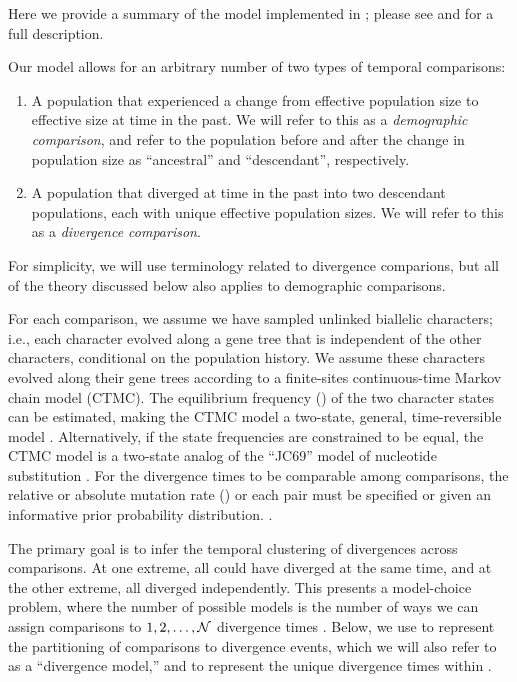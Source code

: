 Here we provide a summary of the model implemented in \ecoevolity; please see
\citet{Oaks2018ecoevolity} and \citet{Oaks2019codemog} for a full description.

Our model allows for an arbitrary number of two types of temporal comparisons:
\begin{enumerate}
    \item A population that experienced a change from effective population size
        \epopsize[\rootpopindex]
        to effective size
        \epopsize[\descendantpopindex{}]
        at time \comparisonetime in the past.
        We will refer to this as a \emph{demographic comparison},
        and refer to the population before and after the change in population
        size as ``ancestral'' and ``descendant'', respectively.
    \item A population that diverged at time \comparisonetime in the past into
        two descendant populations, each with unique effective population
        sizes.
        We will refer to this as a \emph{divergence comparison}.
\end{enumerate}
For simplicity, we will use terminology related to divergence comparions, but
all of the theory discussed below also applies to demographic comparisons.

For each comparison, we assume we have sampled unlinked biallelic characters;
i.e., each character evolved along a gene tree that is independent of the
other characters, conditional on the population history.
We assume these characters evolved along their gene trees according to a
finite-sites continuous-time Markov chain model (CTMC).
The equilibrium frequency (\gfreq) of the two character states can be
estimated, making the CTMC model a two-state, general, time-reversible model
\citep{Tavare1986}.
Alternatively, if the state frequencies are constrained to be equal, the CTMC
model is a two-state analog of the ``JC69'' model of nucleotide substitution
\citep{JC1969}.
For the divergence times to be comparable among comparisons, the relative or
absolute mutation rate (\murate) or each pair must be specified or given an
informative prior probability distribution.
\citep{Oaks2018ecoevolity,Oaks2019codemog}.

The primary goal is to infer the temporal clustering of divergences across
\ncomparisons comparisons.
At one extreme, all \ncomparisons could have diverged at the same time,
and at the other extreme, all \ncomparisons diverged independently.
This presents a model-choice problem, where the number of possible models
is the number of ways we can assign \ncomparisons comparisons to
$1, 2,  \ldots, \mathcal{N}$ divergence times
\citep[the Bell number;][]{Bell1934}.
Below, we use \etimesets to represent the partitioning of comparisons to
divergence events, which we will also refer to as a ``divergence model,'' and
\etimes to represent the unique divergence times within \etimesets.

